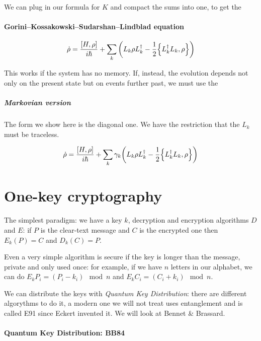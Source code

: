 \documentclass[main.tex]{subfiles}
\begin{document}
We can plug in our formula for \(K\)  and compact the sums into one, to get the

\paragraph{Gorini–Kossakowski–Sudarshan–Lindblad equation}

\begin{equation}
    \dot{\rho} = \frac{[H, \rho]}{i \hbar}  + \sum _k \qty( L_k \rho L_k ^\dag  - \frac{1}{2} \qty{L_k ^\dag L_k, \rho})
\end{equation}

This works if the system has no memory. If, instead, the evolution depends not only on the present state but on events further past, we must use the

\subparagraph{Markovian version}

The form we show here is the diagonal one. We have the restriction that the \(L_k\) must be traceless.

\begin{equation}
    \dot{\rho} = \frac{[H, \rho]}{i \hbar}  + \sum _{k} \gamma_k \qty( L_k \rho L_k ^\dag  - \frac{1}{2} \qty{L_k ^\dag L_k, \rho} )
\end{equation}

\section{One-key cryptography}

The simplest paradigm: we have a key \(k\), decryption and encryption algorithms \(D\) and \(E\): if \(P\) is the clear-text message and \(C \) is the encrypted one then \(E_k (P) = C\) and \(D_k (C) = P\).

Even a very simple algorithm is secure if the key is longer than the message, private and only used once: for example, if we have \(n\) letters in our alphabet, we can do \(E_k P_i = (P_i - k_i)\mod n\) and \(E_k C_i = (C_i + k_i)\mod n\).

We can distribute the keys with \emph{Quantum Key Distribution}: there are different algorythms to do it, a modern one we will not treat uses entanglement and is called E91 since Eckert invented it. We will look at Bennet \& Brassard.

\paragraph{Quantum Key Distribution: BB84}
\end{document}
